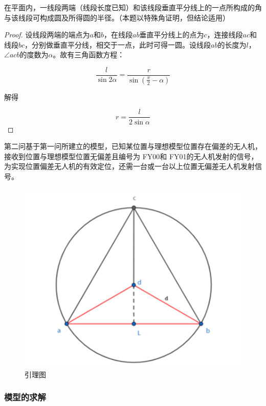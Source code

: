 \begin{theorem}
    在平面内，一线段两端（线段长度已知）和该线段垂直平分线上的一点所构成的角与该线段可构成圆及所得圆的半径。（本题以特殊角证明，但结论适用）
\end{theorem}

\begin{proof}
    设线段两端的端点为$a$和$b$，在线段$ab$垂直平分线上的点为$c$，连接线段$ac$和线段$bc$，分别做垂直平分线，相交于一点，此时可得一圆。设线段$ab$的长度为$l$，$\angle acb$的度数为$\alpha$。故有三角函数方程：

    \begin{equation}
        \frac{l}{\sin 2\alpha}=
        \frac{r}{\sin(\frac{\pi}{2}-\alpha)}
    \end{equation}

    解得

    \begin{equation}
        r=\frac{l}{2\sin\alpha}
    \end{equation}
\end{proof}

第二问基于第一问所建立的模型，已知某位置与理想模型位置存在偏差的无人机，接收到位置与理想模型位置无偏差且编号为 FY00和 FY01的无人机发射的信号，为实现位置偏差无人机的有效定位，还需一台或一台以上位置无偏差无人机发射信号。

\begin{figure}[h]
    \centering
    \includegraphics{res/lemmaFigure.png}
    \caption{引理图}
\end{figure}

\subsubsection{模型的求解}

